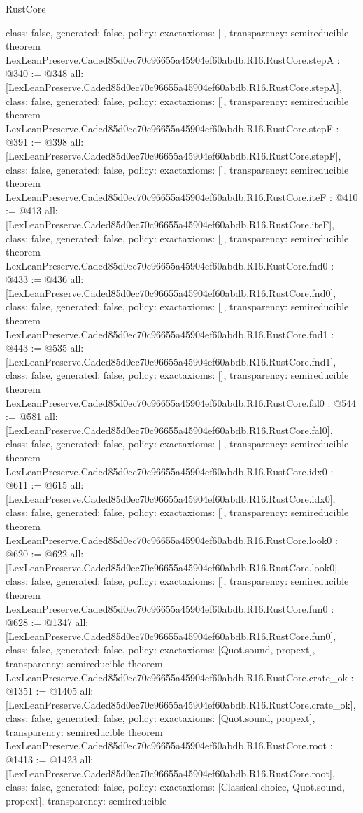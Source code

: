 \begin{lexlean}{RustCore}
\begin{coremodule}
{  class: false,
  generated: false,
  policy: exact{axioms: []},
  transparency: semireducible
}
theorem LexLeanPreserve.Caded85d0ec70c96655a45904ef60abdb.R16.RustCore.stepA : @340 := @348 {
  all: [LexLeanPreserve.Caded85d0ec70c96655a45904ef60abdb.R16.RustCore.stepA],
  class: false,
  generated: false,
  policy: exact{axioms: []},
  transparency: semireducible
}
theorem LexLeanPreserve.Caded85d0ec70c96655a45904ef60abdb.R16.RustCore.stepF : @391 := @398 {
  all: [LexLeanPreserve.Caded85d0ec70c96655a45904ef60abdb.R16.RustCore.stepF],
  class: false,
  generated: false,
  policy: exact{axioms: []},
  transparency: semireducible
}
theorem LexLeanPreserve.Caded85d0ec70c96655a45904ef60abdb.R16.RustCore.iteF : @410 := @413 {
  all: [LexLeanPreserve.Caded85d0ec70c96655a45904ef60abdb.R16.RustCore.iteF],
  class: false,
  generated: false,
  policy: exact{axioms: []},
  transparency: semireducible
}
theorem LexLeanPreserve.Caded85d0ec70c96655a45904ef60abdb.R16.RustCore.fnd0 : @433 := @436 {
  all: [LexLeanPreserve.Caded85d0ec70c96655a45904ef60abdb.R16.RustCore.fnd0],
  class: false,
  generated: false,
  policy: exact{axioms: []},
  transparency: semireducible
}
theorem LexLeanPreserve.Caded85d0ec70c96655a45904ef60abdb.R16.RustCore.fnd1 : @443 := @535 {
  all: [LexLeanPreserve.Caded85d0ec70c96655a45904ef60abdb.R16.RustCore.fnd1],
  class: false,
  generated: false,
  policy: exact{axioms: []},
  transparency: semireducible
}
theorem LexLeanPreserve.Caded85d0ec70c96655a45904ef60abdb.R16.RustCore.fal0 : @544 := @581 {
  all: [LexLeanPreserve.Caded85d0ec70c96655a45904ef60abdb.R16.RustCore.fal0],
  class: false,
  generated: false,
  policy: exact{axioms: []},
  transparency: semireducible
}
theorem LexLeanPreserve.Caded85d0ec70c96655a45904ef60abdb.R16.RustCore.idx0 : @611 := @615 {
  all: [LexLeanPreserve.Caded85d0ec70c96655a45904ef60abdb.R16.RustCore.idx0],
  class: false,
  generated: false,
  policy: exact{axioms: []},
  transparency: semireducible
}
theorem LexLeanPreserve.Caded85d0ec70c96655a45904ef60abdb.R16.RustCore.look0 : @620 := @622 {
  all: [LexLeanPreserve.Caded85d0ec70c96655a45904ef60abdb.R16.RustCore.look0],
  class: false,
  generated: false,
  policy: exact{axioms: []},
  transparency: semireducible
}
theorem LexLeanPreserve.Caded85d0ec70c96655a45904ef60abdb.R16.RustCore.fun0 : @628 := @1347 {
  all: [LexLeanPreserve.Caded85d0ec70c96655a45904ef60abdb.R16.RustCore.fun0],
  class: false,
  generated: false,
  policy: exact{axioms: [Quot.sound, propext]},
  transparency: semireducible
}
theorem LexLeanPreserve.Caded85d0ec70c96655a45904ef60abdb.R16.RustCore.crate_ok : @1351 := @1405 {
  all: [LexLeanPreserve.Caded85d0ec70c96655a45904ef60abdb.R16.RustCore.crate_ok],
  class: false,
  generated: false,
  policy: exact{axioms: [Quot.sound, propext]},
  transparency: semireducible
}
theorem LexLeanPreserve.Caded85d0ec70c96655a45904ef60abdb.R16.RustCore.root : @1413 := @1423 {
  all: [LexLeanPreserve.Caded85d0ec70c96655a45904ef60abdb.R16.RustCore.root],
  class: false,
  generated: false,
  policy: exact{axioms: [Classical.choice, Quot.sound, propext]},
  transparency: semireducible
}


\end{coremodule}
\end{lexlean}
